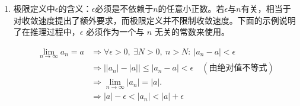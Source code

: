 \documentclass[a4paper,12pt]{article}
\begin{document}
\begin{enumerate}
\begin{itemize}
            \textbf{{\color{red}{证}}：}
            由于 $f(a)=a$，有
            \[
                |x_{n+1}-a|=|f(x_n)-f(a)|.
            \]
            由拉格朗日中值定理，存在 $\xi$ 介于 $x_n$ 与 $a$ 之间，使得
            \[
                |f(x_n)-f(a)|
                =|f'(\xi)|\,|x_n-a|.
            \]
            又由条件 $|f'(x)|\le k<1$，可得
            \[
                |x_{n+1}-a|\le k|x_n-a|.
            \]
            由原理一（压缩不等式），得
            \[
                \lim_{n\to\infty}x_n=a.
            \]
        \end{itemize}
        \item 极限定义中$\epsilon$的含义：$\epsilon$必须是不依赖于$n$的任意小正数。若$\epsilon$与$n$有关，相当于对收敛速度提出了额外要求，而极限定义并不限制收敛速度。下面的示例说明了在推理过程中，$\epsilon$ 必须作为一个与 $n$ 无关的常数来使用。
        \begin{analysisbox}[示例]
            \[
                \begin{aligned}
                    \lim_{n \to \infty} a_n = a
                    &\Rightarrow \forall \epsilon > 0,\ \exists N > 0,\ n > N:\ |a_n - a| < \epsilon \\[4pt]
                    &\Rightarrow \bigl||a_n| - |a|\bigr| \le |a_n - a| < \epsilon
                    \quad (\text{由绝对值不等式}) \\[4pt]
                    &\Rightarrow \lim_{n \to \infty} |a_n| = |a|. \\[4pt]
                    &\Rightarrow |a| - \epsilon < |a_n| < |a| + \epsilon \\[4pt]
                \end{aligned}
            \]
        \end{analysisbox}

    \end{enumerate}
\end{document}
